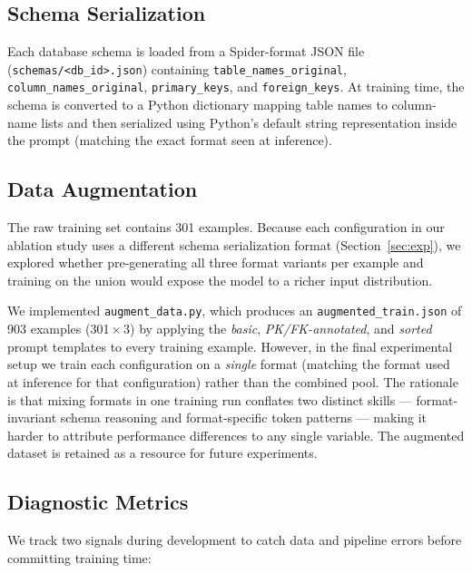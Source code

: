 \documentclass[11pt,letterpaper]{article}
\begin{document}
\subsection{Schema Serialization}

Each database schema is loaded from a Spider-format JSON file
(\texttt{schemas/<db\_id>.json}) containing \texttt{table\_names\_original},
\texttt{column\_names\_original}, \texttt{primary\_keys}, and
\texttt{foreign\_keys}.
At training time, the schema is converted to a Python dictionary mapping table
names to column-name lists and then serialized using Python's default
string representation inside the prompt (matching the exact format seen at
inference).

\subsection{Data Augmentation}

The raw training set contains 301 examples.
Because each configuration in our ablation study uses a different schema
serialization format (Section~\ref{sec:exp}), we explored whether
pre-generating all three format variants per example and training on the union
would expose the model to a richer input distribution.

We implemented \texttt{augment\_data.py}, which produces an
\texttt{augmented\_train.json} of 903 examples (301\,$\times$\,3) by applying
the \emph{basic}, \emph{PK/FK-annotated}, and \emph{sorted} prompt templates
to every training example.
However, in the final experimental setup we train each configuration on a
\emph{single} format (matching the format used at inference for that
configuration) rather than the combined pool.
The rationale is that mixing formats in one training run conflates two distinct
skills --- format-invariant schema reasoning and format-specific token
patterns --- making it harder to attribute performance differences to any
single variable.
The augmented dataset is retained as a resource for future experiments.

\subsection{Diagnostic Metrics}

We track two signals during development to catch data and pipeline errors
before committing training time:
\end{document}
